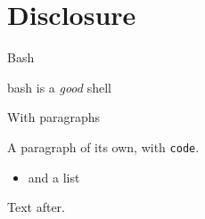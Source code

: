 \section{Disclosure}\label{disclosure}

Bash

bash is a \emph{good} shell

With paragraphs

A paragraph of its own, with \texttt{code}.

\begin{itemize}
\tightlist
\item
  and a list
\end{itemize}

Text after.
